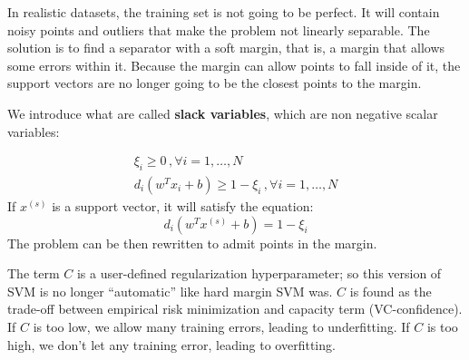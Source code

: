 In realistic datasets, the training set is not going to be perfect. It will contain noisy points and outliers that make the problem not linearly separable. The solution is to find a separator with a soft margin, that is, a margin that allows some errors within it. Because the margin can allow points to fall inside of it, the support vectors are no longer going to be the closest points to the margin.

We introduce what are called \textbf{slack variables}, which are non negative scalar variables:

\begin{gather*}
    \xi_i \geq 0 \, , \forall i = 1, \dots , N \\
    d_i(w^T x_i + b) \geq 1 - \xi_i \, , \forall i = 1, \dots , N
\end{gather*}
If $x^{(s)}$ is a support vector, it will satisfy the equation:
\begin{equation*}
    d_i(w^T x^{(s)} + b) = 1 - \xi_i 
\end{equation*}
The problem can be then rewritten to admit points in the margin.

The term $C$ is a user-defined regularization hyperparameter; so this version of SVM is no longer ``automatic'' like hard margin SVM was. $C$ is found as the trade-off between empirical risk minimization and capacity term (VC-confidence). If $C$ is too low, we allow many training errors, leading to underfitting. If $C$ is too high, we don't let any training error, leading to overfitting.

